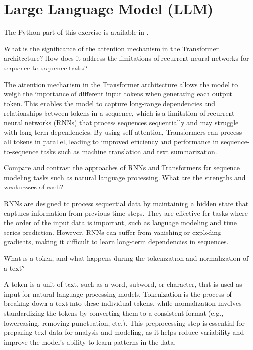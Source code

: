 \section{Large Language Model (LLM)}

The Python part of this exercise is available in .\\

\begin{ejercicio}[Transformer]
    What is the significance of the attention mechanism in the Transformer architecture? How does it address the limitations of recurrent neural networks for sequence-to-sequence tasks?

    The attention mechanism in the Transformer architecture allows the model to weigh the importance of different input tokens when generating each output token. This enables the model to capture long-range dependencies and relationships between tokens in a sequence, which is a limitation of recurrent neural networks (RNNs) that process sequences sequentially and may struggle with long-term dependencies. By using self-attention, Transformers can process all tokens in parallel, leading to improved efficiency and performance in sequence-to-sequence tasks such as machine translation and text summarization.
\end{ejercicio}

\begin{ejercicio}
    Compare and contrast the approaches of RNNs and Transformers for sequence modeling tasks such as natural language processing. What are the strengths and weaknesses of each?

    RNNs are designed to process sequential data by maintaining a hidden state that captures information from previous time steps. They are effective for tasks where the order of the input data is important, such as language modeling and time series prediction. However, RNNs can suffer from vanishing or exploding gradients, making it difficult to learn long-term dependencies in sequences.
\end{ejercicio}

\begin{ejercicio}
    What is a token, and what happens during the tokenization and normalization of a text?

    A token is a unit of text, such as a word, subword, or character, that is used as input for natural language processing models. Tokenization is the process of breaking down a text into these individual tokens, while normalization involves standardizing the tokens by converting them to a consistent format (e.g., lowercasing, removing punctuation, etc.). This preprocessing step is essential for preparing text data for analysis and modeling, as it helps reduce variability and improve the model's ability to learn patterns in the data.
\end{ejercicio}

